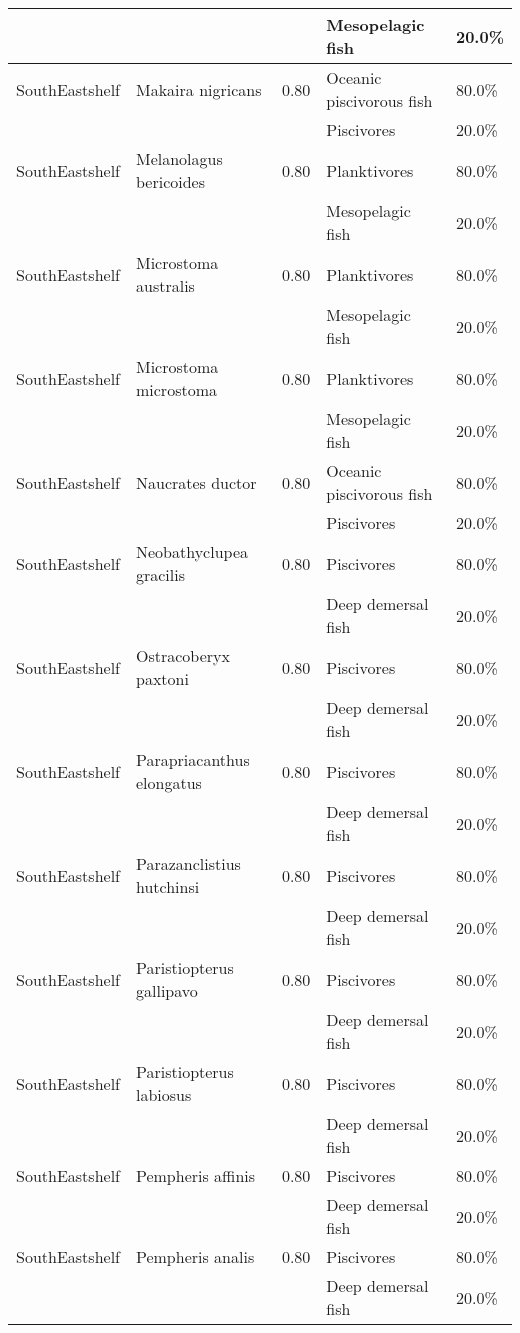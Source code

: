 \begin{longtable}{llcll}
& & & Mesopelagic fish & 20.0\% \\
\hline
SouthEastshelf & Makaira nigricans & 0.80 & Oceanic piscivorous fish & 80.0\% \\
& & & Piscivores & 20.0\% \\
\hline
SouthEastshelf & Melanolagus bericoides & 0.80 & Planktivores & 80.0\% \\
& & & Mesopelagic fish & 20.0\% \\
\hline
SouthEastshelf & Microstoma australis & 0.80 & Planktivores & 80.0\% \\
& & & Mesopelagic fish & 20.0\% \\
\hline
SouthEastshelf & Microstoma microstoma & 0.80 & Planktivores & 80.0\% \\
& & & Mesopelagic fish & 20.0\% \\
\hline
SouthEastshelf & Naucrates ductor & 0.80 & Oceanic piscivorous fish & 80.0\% \\
& & & Piscivores & 20.0\% \\
\hline
SouthEastshelf & Neobathyclupea gracilis & 0.80 & Piscivores & 80.0\% \\
& & & Deep demersal fish & 20.0\% \\
\hline
SouthEastshelf & Ostracoberyx paxtoni & 0.80 & Piscivores & 80.0\% \\
& & & Deep demersal fish & 20.0\% \\
\hline
SouthEastshelf & Parapriacanthus elongatus & 0.80 & Piscivores & 80.0\% \\
& & & Deep demersal fish & 20.0\% \\
\hline
SouthEastshelf & Parazanclistius hutchinsi & 0.80 & Piscivores & 80.0\% \\
& & & Deep demersal fish & 20.0\% \\
\hline
SouthEastshelf & Paristiopterus gallipavo & 0.80 & Piscivores & 80.0\% \\
& & & Deep demersal fish & 20.0\% \\
\hline
SouthEastshelf & Paristiopterus labiosus & 0.80 & Piscivores & 80.0\% \\
& & & Deep demersal fish & 20.0\% \\
\hline
SouthEastshelf & Pempheris affinis & 0.80 & Piscivores & 80.0\% \\
& & & Deep demersal fish & 20.0\% \\
\hline
SouthEastshelf & Pempheris analis & 0.80 & Piscivores & 80.0\% \\
& & & Deep demersal fish & 20.0\% \\

\end{longtable}

